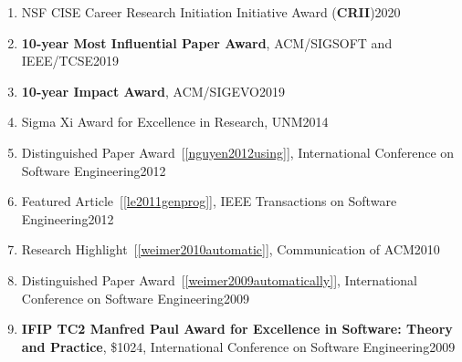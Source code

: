 \documentclass[10pt]{article}
\begin{document}
\begin{enumerate}
\item NSF CISE Career Research Initiation Initiative Award (\textbf{CRII})\hfill 2020
  
\item \textbf{10-year Most Influential Paper Award}, ACM/SIGSOFT and IEEE/TCSE\hfill 2019

  
\item \textbf{10-year Impact Award}, ACM/SIGEVO\hfill 2019

\item  Sigma Xi Award for Excellence in Research, UNM\hfill 2014

\item Distinguished Paper Award~[\ref{nguyen2012using}], International Conference on Software Engineering\hfill 2012

\item Featured Article~[\ref{le2011genprog}], IEEE Transactions on Software Engineering\hfill 2012

\item Research Highlight~[\ref{weimer2010automatic}], Communication of ACM\hfill 2010

\item Distinguished Paper Award~[\ref{weimer2009automatically}], International Conference on Software Engineering\hfill 2009 

\item \textbf{IFIP TC2 Manfred Paul Award for Excellence in Software: Theory and Practice}, \$1024, International Conference on Software Engineering\hfill 2009


\end{enumerate}
\end{document}
